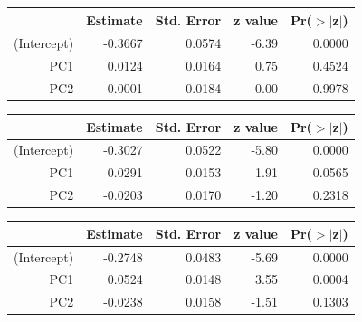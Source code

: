 \documentclass[a4paper,12pt]{Latex/Classes/PhDthesisPSnPDF}
\begin{document}
\newpage
\begin{center}
\begin{table}[ht]
\centering
\begin{tabular}{rrrrr}
  \hline
 & Estimate & Std. Error & z value & Pr($>$$|$z$|$) \\ 
  \hline
(Intercept) & -0.3667 & 0.0574 & -6.39 & 0.0000 \\ 
  PC1 & 0.0124 & 0.0164 & 0.75 & 0.4524 \\ 
  PC2 & 0.0001 & 0.0184 & 0.00 & 0.9978 \\ 
   \hline
\end{tabular}
\end{table}\end{center}
\begin{center}
\begin{table}[ht]
\centering
\begin{tabular}{rrrrr}
  \hline
 & Estimate & Std. Error & z value & Pr($>$$|$z$|$) \\ 
  \hline
(Intercept) & -0.3027 & 0.0522 & -5.80 & 0.0000 \\ 
  PC1 & 0.0291 & 0.0153 & 1.91 & 0.0565 \\ 
  PC2 & -0.0203 & 0.0170 & -1.20 & 0.2318 \\ 
   \hline
\end{tabular}
\end{table}\end{center}
\begin{center}
\begin{table}[ht]
\centering
\begin{tabular}{rrrrr}
  \hline
 & Estimate & Std. Error & z value & Pr($>$$|$z$|$) \\ 
  \hline
(Intercept) & -0.2748 & 0.0483 & -5.69 & 0.0000 \\ 
  PC1 & 0.0524 & 0.0148 & 3.55 & 0.0004 \\ 
  PC2 & -0.0238 & 0.0158 & -1.51 & 0.1303 \\ 
   \hline
\end{tabular}
\end{table}\end{center}
\end{document}
